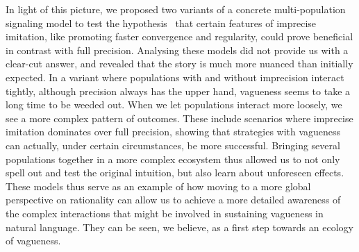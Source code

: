 \documentclass[a4paper]{article}
\begin{document}
In light of this picture, we proposed two variants of a concrete multi-population signaling model to test the hypothesis~\parencite{franke_vagueness_2017} that certain features of imprecise imitation, like promoting faster convergence and regularity, could prove beneficial in contrast with full precision.
Analysing these models did not provide us with a clear-cut answer, and revealed that the story is much more nuanced than initially expected.
In a variant where populations with and without imprecision interact tightly, although precision always has the upper hand, vagueness seems to take a long time to be weeded out.
When we let populations interact more loosely, we see a more complex pattern of outcomes.
These include scenarios where imprecise imitation dominates over full precision, showing that strategies with vagueness can actually, under certain circumstances, be more successful.
Bringing several populations together in a more complex ecosystem thus allowed us to not only spell out and test the original intuition, but also learn about unforeseen effects.
These models thus serve as an example of how moving to a more global perspective on rationality can allow us to achieve a more detailed awareness of the complex interactions that might be involved in sustaining vagueness in natural language.
They can be seen, we believe, as a first step towards an ecology of vagueness.


\printbibliography
\end{document}
